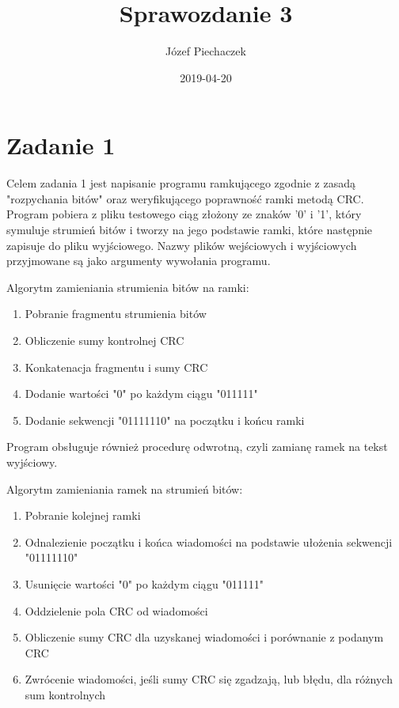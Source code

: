 \documentclass[titlepage]{article}
\title{Sprawozdanie 3}
\date{2019-04-20}
\author{Józef Piechaczek}
\begin{document}
\maketitle
\newpage
{}

\section{Zadanie 1}
Celem zadania 1 jest napisanie programu ramkującego zgodnie z zasadą "rozpychania bitów" oraz weryfikującego poprawność ramki metodą CRC. Program pobiera z pliku testowego ciąg złożony ze znaków '0' i '1', który symuluje strumień bitów i tworzy na jego podstawie ramki, które następnie zapisuje do pliku wyjściowego. Nazwy plików wejściowych i wyjściowych przyjmowane są jako argumenty wywołania programu.

Algorytm zamieniania strumienia bitów na ramki:
\begin{enumerate}
\itemsep0em
\item Pobranie fragmentu strumienia bitów
\item Obliczenie sumy kontrolnej CRC
\item Konkatenacja fragmentu i sumy CRC
\item Dodanie wartości "0" po każdym ciągu "011111"
\item Dodanie sekwencji "01111110" na początku i końcu ramki
\end{enumerate}

Program obsługuje również procedurę odwrotną, czyli zamianę ramek na tekst wyjściowy.

Algorytm zamieniania ramek na strumień bitów:
\begin{enumerate}
\itemsep0em
\item Pobranie kolejnej ramki
\item Odnalezienie początku i końca wiadomości na podstawie ułożenia sekwencji "01111110"
\item Usunięcie wartości "0" po każdym ciągu "011111"
\item Oddzielenie pola CRC od wiadomości
\item Obliczenie sumy CRC dla uzyskanej wiadomości i porównanie z podanym CRC
\item Zwrócenie wiadomości, jeśli sumy CRC się zgadzają, lub błędu, dla różnych sum kontrolnych
\end{enumerate}
\end{document}
